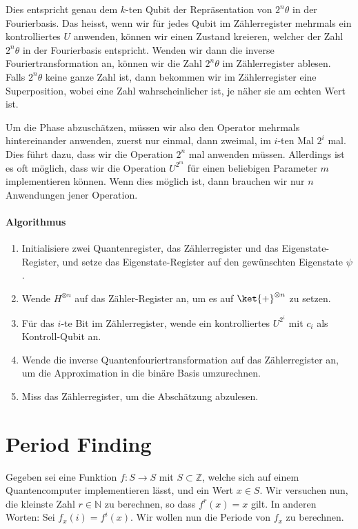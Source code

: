 Dies entspricht genau dem $k$-ten Qubit der Repräsentation von $2^n\theta$ in der Fourierbasis. Das heisst, wenn wir für jedes Qubit im Zählerregister mehrmals ein kontrolliertes $U$ anwenden, können wir einen Zustand kreieren, welcher der Zahl $2^n\theta$ in der Fourierbasis entspricht. Wenden wir dann die inverse Fouriertransformation an, können wir die Zahl $2^n\theta$ im Zählerregister ablesen. Falls $2^n\theta$ keine ganze Zahl ist, dann bekommen wir im Zählerregister eine Superposition, wobei eine Zahl wahrscheinlicher ist, je näher sie am echten Wert ist.

Um die Phase abzuschätzen, müssen wir also den Operator mehrmals hintereinander anwenden, zuerst nur einmal, dann zweimal, im $i$-ten Mal $2^i$ mal. Dies führt dazu, dass wir die Operation $2^n$ mal anwenden müssen. Allerdings ist es oft möglich, dass wir die Operation $U^{2^m}$ für einen beliebigen Parameter $m$ implementieren können. Wenn dies möglich ist, dann brauchen wir nur $n$ Anwendungen jener Operation.

\paragraph{Algorithmus}
\begin{enumerate}
    \item Initialisiere zwei Quantenregister, das Zählerregister und das Eigenstate-Register, und setze das Eigenstate-Register auf den gewünschten Eigenstate $\psi$.
    \item Wende $H^{\otimes n}$ auf das Zähler-Register an, um es auf $\ket{+}^{\otimes n}$ zu setzen.
    \item Für das $i$-te Bit im Zählerregister, wende ein kontrolliertes $U^{2^i}$ mit $c_i$ als Kontroll-Qubit an.
    \item Wende die inverse Quantenfouriertransformation auf das Zählerregister an, um die Approximation in die binäre Basis umzurechnen.
    \item Miss das Zählerregister, um die Abschätzung abzulesen.
\end{enumerate}
 \newline

\section{Period Finding}
Gegeben sei eine Funktion $f : S \rightarrow S$ mit $S \subset \mathbb{Z}$, welche sich auf einem Quantencomputer implementieren lässt, und ein Wert $x \in S$. Wir versuchen nun, die kleinste Zahl $r \in \mathbb{N}$ zu berechnen, so dass $f^r(x) = x$ gilt. In anderen Worten: Sei $f_x(i) = f^i(x)$. Wir wollen nun die Periode von $f_x$ zu berechnen.

